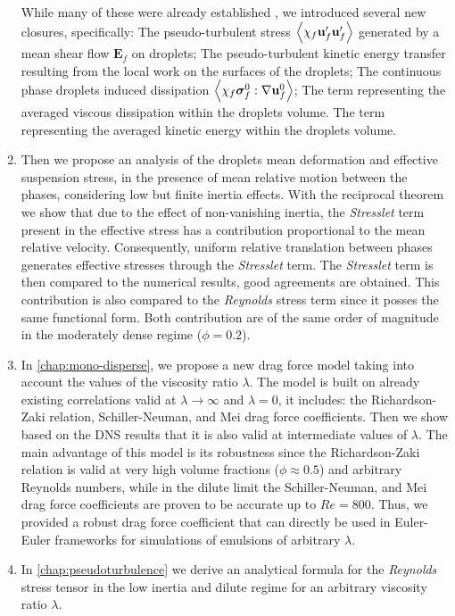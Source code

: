\begin{enumerate}
    While many of these were already established \citep[Appendix A]{zhang1997momentum}, we introduced several new closures, specifically: 
    The pseudo-turbulent stress $\left<\chi_f \textbf{u}_f'\textbf{u}_f'\right>$ generated by a mean shear flow $\textbf{E}_f$ on droplets; 
    The pseudo-turbulent kinetic energy transfer resulting from the local work on the surfaces of the droplets; 
    The continuous phase droplets induced dissipation $\left<\chi_f \bm\sigma_f^0:\mathbf{\nabla} \textbf{u}_f^0\right>$; 
    The term representing the averaged viscous dissipation within the droplets volume. 
    The term representing the averaged kinetic energy within the droplets volume. 
    \item Then we propose an analysis of the droplets mean deformation and effective suspension stress, in the presence of mean relative motion between the phases, considering low but finite inertia effects. 
    With the reciprocal theorem we show that due to the effect of non-vanishing inertia, the \textit{Stresslet}  term present in the effective stress has a contribution proportional to the mean relative velocity. 
    Consequently, uniform relative translation between phases generates effective stresses through the \textit{Stresslet} term. 
    The \textit{Stresslet} term is then compared to the numerical results, good agreements are obtained. 
    This contribution is also compared to the \textit{Reynolds} stress term since it posses the same functional form.
    Both contribution are of the same order of magnitude in the moderately dense regime ($\phi =0.2$). 
    \item In \ref{chap:mono-disperse}, we propose a new drag force model taking into account the values of the viscosity ratio $\lambda$. 
    The model is built on already existing correlations valid at $\lambda\to\infty$ and $\lambda = 0$, it includes: the Richardson-Zaki relation, Schiller-Neuman, and Mei drag force coefficients.
    Then we show based on the DNS results that it is also valid at intermediate values of $\lambda$.
    The main advantage of this model is its robustness since the Richardson-Zaki relation is valid at very high volume fractions  ($\phi \approx 0.5$) and arbitrary Reynolds numbers, while in the dilute limit the Schiller-Neuman, and Mei drag force coefficients are proven to be accurate up to $Re = 800$. 
    Thus, we provided a robust drag force coefficient that can directly be used in Euler-Euler frameworks for simulations of emulsions of arbitrary $\lambda$.   
    \item In \ref{chap:pseudoturbulence} we derive an analytical formula for the \textit{Reynolds} stress tensor in the low inertia and dilute regime for an arbitrary viscosity ratio $\lambda$. 

\end{enumerate}
